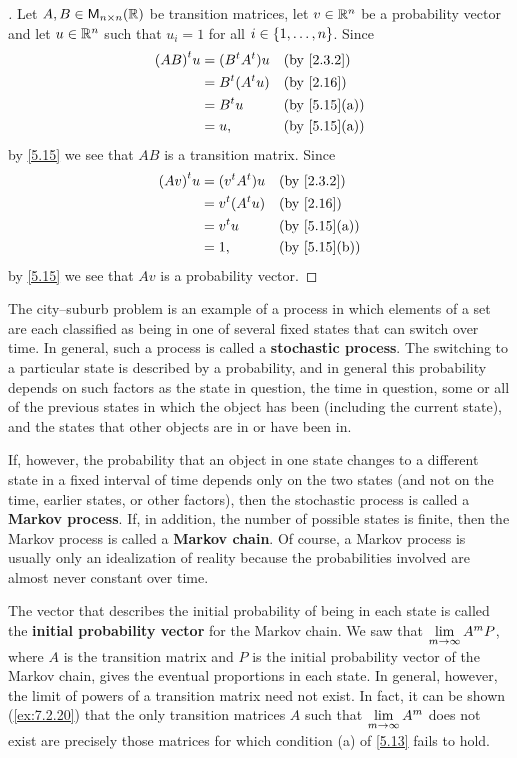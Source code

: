 \begin{proof}[]
  Let \(A, B \in \ms[n][n][\R]\) be transition matrices, let \(v \in \mathbb{R}^n\) be a probability vector and let \(u \in \mathbb{R}^n\) such that \(u_i = 1\) for all \(i \in \left\lbrace1, \dots, n\right\rbrace\).
  Since
  \begin{align*}
    \tp{(AB)} u & = (\tp{B} \tp{A}) u &  & \by{2.3.2}   \\
                & = \tp{B} (\tp{A} u) &  & \by{2.16}    \\
                & = \tp{B} u          &  & \by{5.15}[a] \\
                & = u,                &  & \by{5.15}[a]
  \end{align*}
  by \cref{5.15} we see that \(AB\) is a transition matrix.
  Since
  \begin{align*}
    \tp{(Av)} u & = (\tp{v} \tp{A}) u &  & \by{2.3.2}   \\
                & = \tp{v} (\tp{A} u) &  & \by{2.16}    \\
                & = \tp{v} u          &  & \by{5.15}[a] \\
                & = 1,                &  & \by{5.15}[b]
  \end{align*}
  by \cref{5.15} we see that \(Av\) is a probability vector.
\end{proof}

\begin{defn}\label{5.3.6}
  The city--suburb problem is an example of a process in which elements of a set are each classified as being in one of several fixed states that can switch over time.
  In general, such a process is called a \textbf{stochastic process}.
  The switching to a particular state is described by a probability, and in general this probability depends on such factors as the state in question, the time in question, some or all of the previous states in which the object has been (including the current state), and the states that other objects are in or have been in.

  If, however, the probability that an object in one state changes to a different state in a fixed interval of time depends only on the two states (and not on the time, earlier states, or other factors), then the stochastic process is called a \textbf{Markov process}.
  If, in addition, the number of possible states is finite, then the Markov process is called a \textbf{Markov chain}.
  Of course, a Markov process is usually only an idealization of reality because the probabilities involved are almost never constant over time.

  The vector that describes the initial probability of being in each state is called the \textbf{initial probability vector} for the Markov chain.
  We saw that \(\lim\limits_{m \to \infty} A^m P\), where \(A\) is the transition matrix and \(P\) is the initial probability vector of the Markov chain, gives the eventual proportions in each state.
  In general, however, the limit of powers of a transition matrix need not exist.
  In fact, it can be shown (\cref{ex:7.2.20}) that the only transition matrices \(A\) such that \(\lim\limits_{m \to \infty} A^m\) does not exist are precisely those matrices for which condition (a) of \cref{5.13} fails to hold.
\end{defn}

